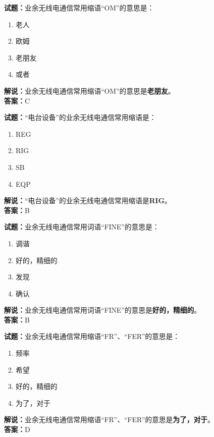 \documentclass{ctexbook}
\begin{document}
\vspace{1em}

\textbf{试题：}业余无线电通信常用缩语“OM”的意思是：
\begin{enumerate}[leftmargin=3em]
  \item 老人
  \item 欧姆
  \item 老朋友
  \item 或者
\end{enumerate}
\noindent\textbf{解说：}业余无线电通信常用缩语“OM”的意思是\textbf{老朋友}。\\\noindent\textbf{答案：}C

\vspace{1em}

\textbf{试题：}“电台设备”的业余无线电通信常用缩语是：
\begin{enumerate}[leftmargin=3em]
  \item REG
  \item RIG
  \item SB
  \item EQP
\end{enumerate}
\noindent\textbf{解说：}“电台设备”的业余无线电通信常用缩语是\textbf{RIG}。\\\noindent\textbf{答案：}B

\vspace{1em}

\textbf{试题：}业余无线电通信常用词语“FINE”的意思是：
\begin{enumerate}[leftmargin=3em]
  \item 调谐
  \item 好的，精细的
  \item 发现
  \item 确认
\end{enumerate}
\noindent\textbf{解说：}业余无线电通信常用词语“FINE”的意思是\textbf{好的，精细的}。\\\noindent\textbf{答案：}B
\vspace{1em}

\textbf{试题：}业余无线电通信常用缩语“FR”、“FER”的意思是：
\begin{enumerate}[leftmargin=3em]
  \item 频率
  \item 希望
  \item 好的，精细的
  \item 为了，对于
\end{enumerate}
\noindent\textbf{解说：}业余无线电通信常用缩语“FR”、“FER”的意思是\textbf{为了，对于}。\\
\noindent\textbf{答案：}D
\end{document}
